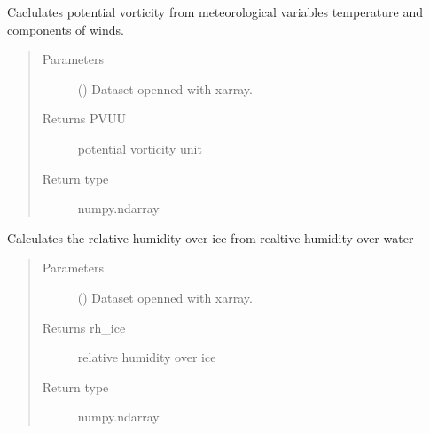 \documentclass[a4paper,11pt,english]{sphinxmanual}
\begin{document}
\begin{fulllineitems}
\label{\detokenize{envlib:envlib.calc_altrv_vars.get_pvu}}
\sphinxAtStartPar
Caclulates potential vorticity from meteorological variables temperature and components of winds.
\begin{quote}\begin{description}
\item[{Parameters}] \leavevmode
\sphinxAtStartPar
{} () \textendash{} Dataset openned with xarray.

\item[{Returns PVUU}] \leavevmode
\sphinxAtStartPar
potential vorticity unit

\item[{Return type}] \leavevmode
\sphinxAtStartPar
numpy.ndarray

\end{description}\end{quote}

\end{fulllineitems}


\begin{fulllineitems}
\label{\detokenize{envlib:envlib.calc_altrv_vars.get_r}}
\end{fulllineitems}


\begin{fulllineitems}
\label{\detokenize{envlib:envlib.calc_altrv_vars.get_rh_ice}}
\sphinxAtStartPar
Calculates the relative humidity over ice from realtive humidity over water
\begin{quote}\begin{description}
\item[{Parameters}] \leavevmode
\sphinxAtStartPar
{} () \textendash{} Dataset openned with xarray.

\item[{Returns rh\_ice}] \leavevmode
\sphinxAtStartPar
relative humidity over ice

\item[{Return type}] \leavevmode
\sphinxAtStartPar
numpy.ndarray

\end{description}\end{quote}

\end{fulllineitems}
\end{document}

